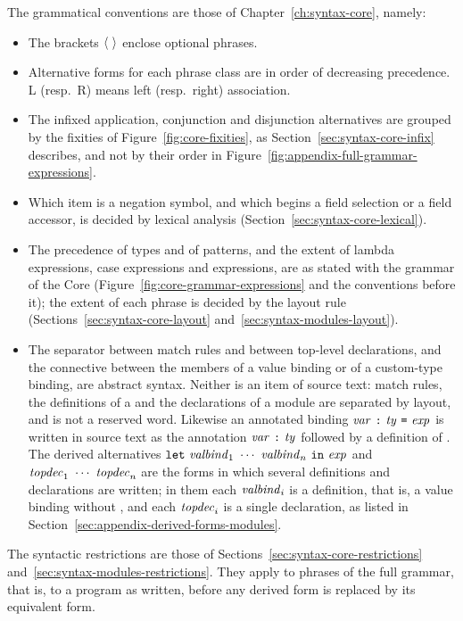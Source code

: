 The grammatical conventions are those of Chapter~\ref{ch:syntax-core}, namely:
\begin{itemize}
\item The brackets $\langle \ \rangle$ enclose optional phrases.
\item Alternative forms for each phrase class are in order of decreasing
  precedence. L (resp.\ R) means left (resp.\ right) association.
\item The infixed application, conjunction and disjunction alternatives are
  grouped by the fixities of Figure~\ref{fig:core-fixities}, as
  Section~\ref{sec:syntax-core-infix} describes, and not by their order in
  Figure~\ref{fig:appendix-full-grammar-expressions}.
\item Which item \kw{-} is a negation symbol, and which  begins a field
  selection or a field accessor, is decided by lexical analysis
  (Section~\ref{sec:syntax-core-lexical}).
\item The precedence of types and of patterns, and the extent of lambda
  expressions, case expressions and  expressions, are as stated with
  the grammar of the Core (Figure~\ref{fig:core-grammar-expressions} and the
  conventions before it); the extent of each phrase is decided by the layout
  rule (Sections~\ref{sec:syntax-core-layout}
  and~\ref{sec:syntax-modules-layout}).
\item The separator \kw{;} between match rules and between top-level
  declarations, and the connective  between the members of a value
  binding or of a custom-type binding, are abstract syntax. Neither is an
  item of source text: match rules, the definitions of a  and the
  declarations of a module are separated by layout, and  is not a
  reserved word. Likewise an annotated binding
  $\var\ \kw{:}\ \ty\ \kw{=}\ \expm$ is written in source text as the
  annotation $\mathit{var}\ \textnormal{\texttt{:}}\ \mathit{ty}$ followed by a definition of \var. The
  derived alternatives $\kw{let}\ \valbind_1\ \cdots\ \valbind_n\ \kw{in}\
  \expm$ and $\topdec_1\ \cdots\ \topdec_n$ are the forms in which several
  definitions and declarations are written; in them each $\mathit{valbind}_i$ is a
  definition, that is, a value binding without \kw{and}, and each
  $\mathit{topdec}_i$ is a single declaration, as listed in
  Section~\ref{sec:appendix-derived-forms-modules}.
\end{itemize}

The syntactic restrictions are those of
Sections~\ref{sec:syntax-core-restrictions}
and~\ref{sec:syntax-modules-restrictions}. They apply to phrases of the full
grammar, that is, to a program as written, before any derived form is
replaced by its equivalent form.

